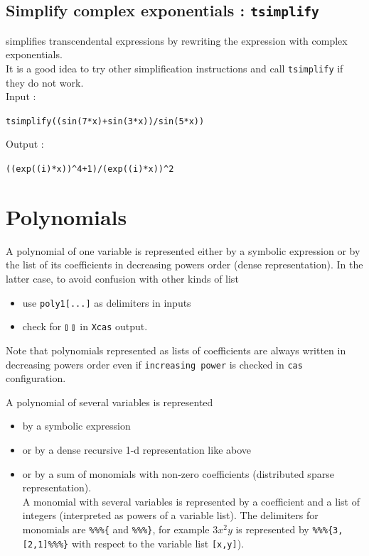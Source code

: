\documentclass[a4paper,11pt]{book}
\begin{document}
\subsection{Simplify complex exponentials : {\tt tsimplify}}
 simplifies transcendental expressions 
by rewriting the expression with complex exponentials.\\
It is a good idea to try other simplification instructions
and call {\tt tsimplify} if they do not work.\\ 
Input :
\begin{center}{\tt tsimplify((sin(7*x)+sin(3*x))/sin(5*x))}\end{center}
Output :
\begin{center}{\tt ((exp((i)*x))\verb|^|4+1)/(exp((i)*x))\verb|^|2 }\end{center}

\section{Polynomials}
\label{sec:polynomials}
A polynomial of one variable is represented either 
by a symbolic expression or by the list of its 
coefficients in decreasing powers order (dense representation).
In the latter case, to avoid confusion with other kinds of list
\begin{itemize}
\item use \verb|poly1[...]| as delimiters in inputs
\item check for $\talloblong \ \talloblong$ in {\tt Xcas} output.
\end{itemize}
Note that polynomials represented as lists of coefficients
are always written in decreasing powers order even if  
{\tt increasing power} is checked in  {\tt cas} configuration.

A polynomial of several variables is represented
\begin{itemize}
\item by a symbolic expression 
\item or by a dense recursive 1-d representation like above
\item or by a sum of
monomials with non-zero coefficients (distributed sparse
representation).\\
A monomial with several variables is represented by a coefficient and a
list of integers (interpreted as powers of a variable list). The 
delimiters for monomials are
{\tt \%\%\%\{} and  {\tt \%\%\%\}}, for example $3x^2y$ is represented by
{\tt \%\%\%\{3,[2,1]\%\%\%\}} with respect to the variable list 
{\tt [x,y]}).
\end{itemize} 
\end{document}
